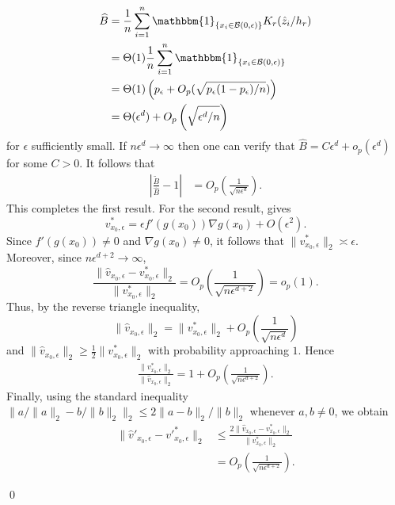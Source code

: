\documentclass[11pt]{article}
\begin{document}
\begin{appendices}
\begin{align*}
\widehat{B} &= \frac{1}{n}\sum_{i = 1}^n\mathbbm{1}_{\{x_i \in \mathcal{B}(0, \epsilon)\}}K_r(\hat{z}_i/h_r) \\
&= \Theta(1)\frac{1}{n}\sum_{i = 1}^n\mathbbm{1}_{\{x_i \in \mathcal{B}(0, \epsilon)\}} \\
&= \Theta(1)\left(p_{\epsilon} + O_p(\sqrt{p_{\epsilon}(1-p_{\epsilon})/n})\right) \\
&= \Theta(\epsilon^d) + O_p\left(\sqrt{\epsilon^d/n}\right)
\end{align*}
for $\epsilon$ sufficiently small. If $n\epsilon^d \rightarrow \infty$ then one can verify that $\widehat{B} = C\epsilon^d + o_p(\epsilon^d)$ for some $C > 0$. It follows that 
\begin{align*}
    \left|\frac{\tilde{B}}{\widehat{B}} - 1\right| &= O_p\left(\frac{1}{\sqrt{n\epsilon^d}}\right).
\end{align*}
This completes the first result. For the second result,  gives
\[
    v^*_{x_0,\epsilon}
    =
    \epsilon f'(g(x_0))\nabla g(x_0)+O(\epsilon^2).
\]
Since $f'(g(x_0))\neq0$ and $\nabla g(x_0)\neq0$, it follows that $\|v^*_{x_0,\epsilon}\|_2\asymp\epsilon$. Moreover, since $n\epsilon^{d+2}\rightarrow\infty$,
\[
    \frac{\|\hat v_{x_0,\epsilon}-v^*_{x_0,\epsilon}\|_2}{\|v^*_{x_0,\epsilon}\|_2}
    =
    O_p\left(\frac{1}{\sqrt{n\epsilon^{d+2}}}\right)
    =
    o_p(1).
\]
Thus, by the reverse triangle inequality,
\[
    \|\hat v_{x_0,\epsilon}\|_2
    =
    \|v^*_{x_0,\epsilon}\|_2
    +
    O_p\left(\frac{1}{\sqrt{n\epsilon^d}}\right)
\]
and $\|\hat v_{x_0,\epsilon}\|_2\geq\frac{1}{2}\|v^*_{x_0,\epsilon}\|_2$ with probability approaching $1$. Hence
\begin{align}
    \frac{\|v^*_{x_0,\epsilon}\|_2}{\|\hat v_{x_0,\epsilon}\|_2}
    =
    1+O_p\left(\frac{1}{\sqrt{n\epsilon^{d+2}}}\right).
    \label{eq: velocity norm ratio}
\end{align}
Finally, using the standard inequality $\|a/\|a\|_2-b/\|b\|_2\|_2\leq 2\|a-b\|_2/\|b\|_2$ whenever $a,b\neq0$, we obtain
\begin{align*}
    \|\hat v'_{x_0,\epsilon}-v'^*_{x_0,\epsilon}\|_2
    &\leq
    \frac{2\|\hat v_{x_0,\epsilon}-v^*_{x_0,\epsilon}\|_2}
    {\|v^*_{x_0,\epsilon}\|_2} \\
    &= O_p\left(\frac{1}{\sqrt{n\epsilon^{d+2}}}\right).
\end{align*}

\qed{}


\end{appendices}
\end{document}
